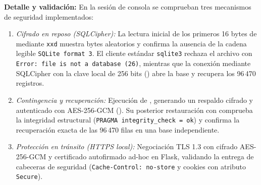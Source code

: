 \documentclass[12pt,a4paper]{article}
\begin{document}
\textbf{Detalle y validación:} En la sesión de consola se comprueban tres mecanismos de seguridad implementados:
\begin{enumerate}
\item \emph{Cifrado en reposo (SQLCipher):} La lectura inicial de los primeros 16 bytes de  mediante \texttt{xxd} muestra bytes aleatorios y confirma la ausencia de la cadena legible \texttt{SQLite format 3}. El cliente estándar \texttt{sqlite3} rechaza el archivo con \texttt{Error: file is not a database (26)}, mientras que la conexión mediante SQLCipher con la clave local de 256 bits () abre la base y recupera los 96\,470 registros.
\item \emph{Contingencia y recuperación:} Ejecución de , generando un respaldo cifrado y autenticado con AES-256-GCM (). Su posterior restauración con  comprueba la integridad estructural (\texttt{PRAGMA integrity\_check = ok}) y confirma la recuperación exacta de las 96\,470 filas en una base independiente.
\item \emph{Protección en tránsito (HTTPS local):} Negociación TLS 1.3 con cifrado AES-256-GCM y certificado autofirmado ad-hoc en Flask, validando la entrega de cabeceras de seguridad (\texttt{Cache-Control: no-store} y cookies con atributo \texttt{Secure}).
\end{enumerate}
\end{document}
